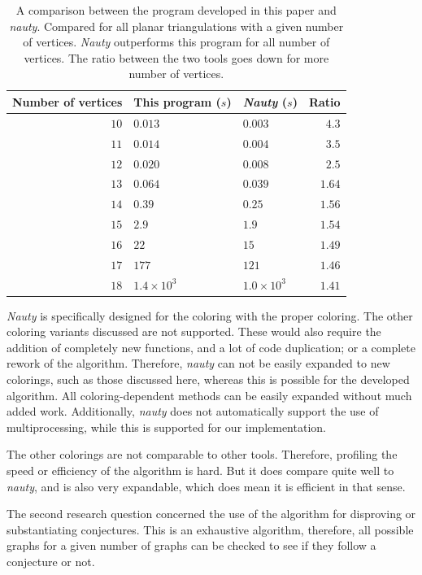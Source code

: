 \documentclass{article}
\begin{document}
\begin{table}
	\centering
	\begin{tabular}{r|ll|r} 
		\hline
		Number of vertices & This program ($s$) & \textit{Nauty} ($s$) & Ratio \\
		\hline
		$10$ & $0.013$ & $0.003$ & $4.3$ \\ 
		$11$ & $0.014$ & $0.004$ & $3.5$ \\
		$12$ & $0.020$ & $0.008$ & $2.5$ \\
		$13$ & $0.064$ & $0.039$ & $1.64$ \\
		$14$ & $0.39$ & $0.25$ & $1.56$ \\
		$15$ & $2.9$ & $1.9$ & $1.54$ \\
		$16$ & $22$ & $15$ & $1.49$ \\
		$17$ & $177$ & $121$ & $1.46$ \\
		$18$ & $1.4 \times 10^{3}$ & $1.0 \times 10^{3}$ & $1.41$
	\end{tabular}
	\caption{A comparison between the program developed in this paper and \textit{nauty}. Compared for all planar triangulations with a given number of vertices. \textit{Nauty} outperforms this program for all number of vertices. The ratio between the two tools goes down for more number of vertices.}\label{tab:nauty}
\end{table}


\textit{Nauty} is specifically designed for the coloring with the proper coloring. The other coloring variants discussed are not supported. These would also require the addition of completely new functions, and a lot of code duplication; or a complete rework of the algorithm. Therefore, \textit{nauty} can not be easily expanded to new colorings, such as those discussed here, whereas this is possible for the developed algorithm. All coloring-dependent methods can be easily expanded without much added work. 
Additionally, \textit{nauty} does not automatically support the use of multiprocessing, while this is supported for our implementation. 

The other colorings are not comparable to other tools. Therefore, profiling the speed or efficiency of the algorithm is hard. But it does compare quite well to \textit{nauty}, and is also very expandable, which does mean it is efficient in that sense.


The second research question concerned the use of the algorithm for disproving or substantiating conjectures. This is an exhaustive algorithm, therefore, all possible graphs for a given number of graphs can be checked to see if they follow a conjecture or not.
\end{document}
